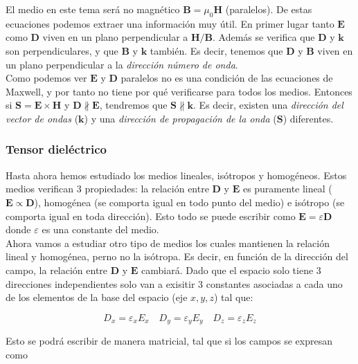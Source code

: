 \documentclass[12pt]{article}
\newcommand{\Bn}{\mathbf{B}}
\newcommand{\En}{\mathbf{E}}
\newcommand{\Dn}{\mathbf{D}}
\newcommand{\Hn}{\mathbf{H}}
\newcommand{\kn}{\mathbf{k}}
\newcommand{\Sn}{\mathbf{S}}
\numberwithin{equation}{section}
\numberwithin{figure}{section}
\begin{document}
El medio en este tema será no magnético $\Bn = \mu_0 \Hn$ (paralelos). De estas ecuaciones podemos extraer una información muy útil. En primer lugar tanto $\En$ como $\Dn$ viven en un plano perpendicular a $\Hn/\Bn$. Además  se verifica que $\Dn$ y $\kn$ son perpendiculares, y que $\Bn$ y $\kn$ también. Es decir, tenemos que $\Dn$ y $\Bn$ viven en un plano perpendicular a la \textit{dirección número de onda}. \\

Como podemos ver $\En$ y $\Dn$ paralelos no es una condición de las ecuaciones de Maxwell, y por tanto no tiene por qué verificarse para todos los medios. Entonces si $\Sn = \En \times \Hn$ y $\Dn \nparallel \En$, tendremos que $\Sn \nparallel \kn$. Es decir, existen una \textit{dirección del vector de ondas} ($\kn$) y una \textit{dirección de propagación de la onda} ($\Sn$) diferentes. 


\subsubsection{Tensor dieléctrico}

Hasta ahora hemos estudiado los medios lineales, isótropos y homogéneos. Estos medios verifican 3 propiedades: la relación entre $\Dn$ y $\En$ es puramente lineal ($\En \varpropto \Dn$), homogénea (se comporta igual en todo punto del medio) e isótropo (se comporta igual en toda dirección). Esto todo se puede escribir como $\En = \varepsilon \Dn$ donde $\varepsilon $ es una constante del medio. \\

Ahora vamos a estudiar otro tipo de medios los cuales mantienen la relación lineal y homogénea, perno no la isótropa. Es decir, en función de la dirección del campo, la relación entre $\Dn$ y $\En$ cambiará. Dado que el espacio solo tiene 3 direcciones independientes solo van a exisitir 3 constantes asociadas a cada uno de los elementos de la base del espacio (eje $x,y,z$) tal que:

\begin{equation}
D_x = \varepsilon_x E_x \quad D_y = \varepsilon_y E_y \quad D_z = \varepsilon_z E_z 
\end{equation}

Esto se podrá escribir de manera matricial, tal que si los campos se expresan como
\end{document}
